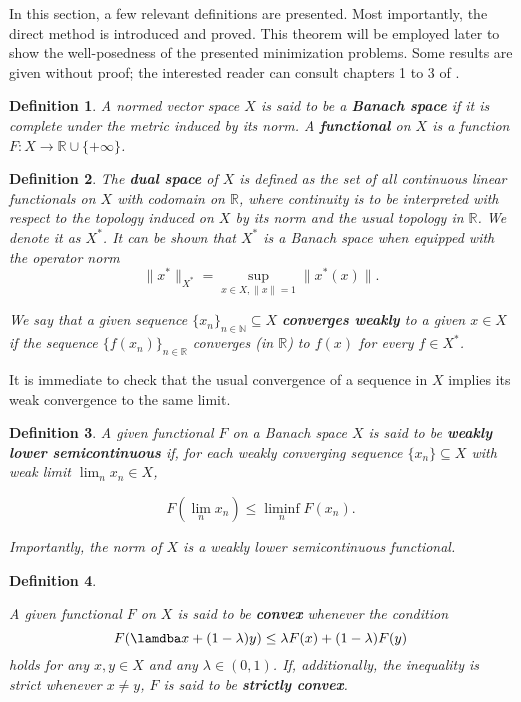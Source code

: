 \documentclass[twocolumn,twoside,a4paper,10pt]{IEEEtran}
\newtheorem{definition}{Definition}
\begin{document}
In this section, a few relevant definitions are presented. Most importantly, the direct method is introduced and proved. This theorem will be employed later to show the well-posedness of the presented minimization problems. Some results are given without proof; the interested reader can consult chapters 1 to 3 of \cite{clason2024introductionnonsmoothanalysisoptimization}.

\begin{definition}
  A normed vector space \(X\) is said to be a \textbf{Banach space} if it is complete under the metric induced by its norm. A \textbf{functional} on \(X\) is a function \(F\colon X\to\mathbb{R}\cup\{+\infty\}\).
\end{definition}

\begin{definition}
  The \textbf{dual space} of \(X\) is defined as the set of all continuous linear functionals on \(X\) with codomain on \(\mathbb{R}\), where continuity is to be interpreted with respect to the topology induced on \(X\) by its norm and the usual topology in \(\mathbb{R}\). We denote it as \(X^*\). It can be shown that \(X^*\) is a Banach space when equipped with the operator norm
  \[
    \|x^*\|_{X^*} = \sup_{x\in X, \|x\|=1}\|x^*(x)\|
  .\]

  We say that a given sequence \(\{x_n\}_{n\in\mathbb{N}}\subseteq X\) \textbf{converges weakly} to a given \(x\in X\) if the sequence \(\{f(x_n)\}_{n\in\mathbb{R}}\) converges (in \(\mathbb{R}\)) to \(f(x)\) for every \(f\in X^*\).
\end{definition}

It is immediate to check that the usual convergence of a sequence in \(X\) implies its weak convergence to the same limit.

\begin{definition}
  A given functional \(F\) on a Banach space \(X\) is said to be \textbf{weakly lower semicontinuous} if, for each weakly converging sequence \(\{x_n\}\subseteq X\) with weak limit \(\lim_nx_n\in X\),

  \[
    F(\lim_nx_n)\leq \liminf_n F(x_n)
  .\]

  Importantly, the norm of \(X\) is a weakly lower semicontinuous functional.
\end{definition}

\begin{definition}\label{def:convexity}

  A given functional \(F\) on \(X\) is said to be \textbf{convex} whenever the condition
  \[
    F(\lamdba x + (1-\lambda)y) \leq \lambda F(x) + (1-\lambda) F(y)
  \]
  holds for any \(x, y\in X\) and any \(\lambda\in(0, 1)\). If, additionally, the inequality is strict whenever \(x\neq y\), \(F\) is said to be \textbf{strictly convex}.
\end{definition}
\end{document}
